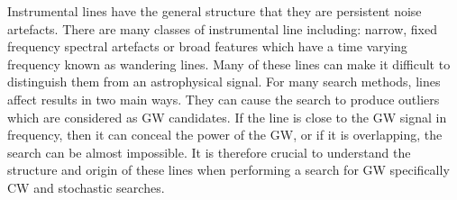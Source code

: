 Instrumental lines have the general structure that they are persistent noise artefacts.
There are many classes of instrumental line including: narrow, fixed frequency spectral artefacts or broad features which have a time varying frequency known as wandering lines.
Many of these lines can make it difficult to distinguish them from an astrophysical signal.
For many search methods, lines affect results in two main ways. 
They can cause the search to produce outliers which are considered as \ac{GW} candidates.
If the line is close to the \ac{GW} signal in frequency, then it can conceal the power of the \ac{GW}, or if it is overlapping, the search can be almost impossible.
It is therefore crucial to understand the structure and origin of these lines when performing a search for \ac{GW} specifically \ac{CW} and stochastic searches.

